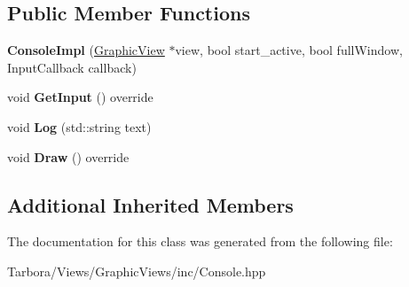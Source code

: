 \subsection*{Public Member Functions}
\begin{DoxyCompactItemize}
\item 
\mbox{\label{classTarbora_1_1ConsoleImpl_aff56ef0e6e2e284636cb9b5f2809448d}} 
{\bfseries Console\+Impl} (\hyperlink{classTarbora_1_1GraphicView}{Graphic\+View} $\ast$view, bool start\+\_\+active, bool full\+Window, Input\+Callback callback)
\item 
\mbox{\label{classTarbora_1_1ConsoleImpl_a772dedbf29837c81cd8a4799bbad6ae2}} 
void {\bfseries Get\+Input} () override
\item 
\mbox{\label{classTarbora_1_1ConsoleImpl_adfb33b8aa112331409e84c1f87fb2cd9}} 
void {\bfseries Log} (std\+::string text)
\item 
\mbox{\label{classTarbora_1_1ConsoleImpl_ad9c1f99c73b1bb80fa384b9db26b33fb}} 
void {\bfseries Draw} () override
\end{DoxyCompactItemize}
\subsection*{Additional Inherited Members}


The documentation for this class was generated from the following file\+:\begin{DoxyCompactItemize}
\item 
Tarbora/\+Views/\+Graphic\+Views/inc/Console.\+hpp\end{DoxyCompactItemize}

